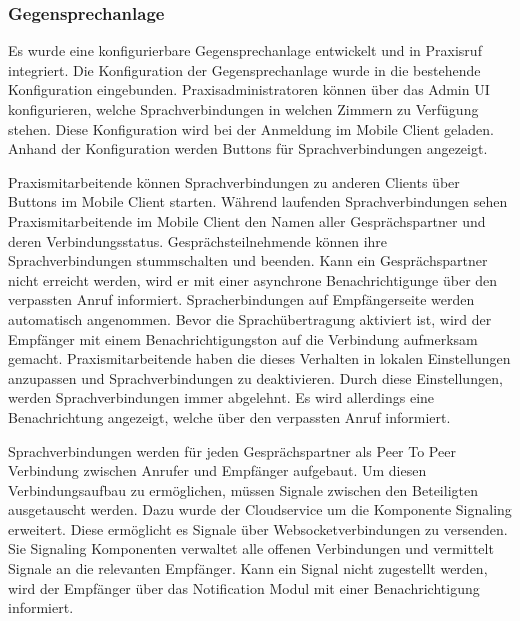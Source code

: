 \subsubsection{Gegensprechanlage}

Es wurde eine konfigurierbare Gegensprechanlage entwickelt und in Praxisruf integriert.
Die Konfiguration der Gegensprechanlage wurde in die bestehende Konfiguration eingebunden.
Praxisadministratoren können über das Admin UI konfigurieren, welche Sprachverbindungen in welchen Zimmern zu Verfügung stehen.
Diese Konfiguration wird bei der Anmeldung im Mobile Client geladen.
Anhand der Konfiguration werden Buttons für Sprachverbindungen angezeigt.

Praxismitarbeitende können Sprachverbindungen zu anderen Clients über Buttons im Mobile Client starten.
Während laufenden Sprachverbindungen sehen Praxismitarbeitende im Mobile Client den Namen aller Gesprächspartner und deren Verbindungsstatus.
Gesprächsteilnehmende können ihre Sprachverbindungen stummschalten und beenden.
Kann ein Gesprächspartner nicht erreicht werden, wird er mit einer asynchrone Benachrichtigunge über den verpassten Anruf informiert.
Spracherbindungen auf Empfängerseite werden automatisch angenommen.
Bevor die Sprachübertragung aktiviert ist, wird der Empfänger mit einem Benachrichtigungston auf die Verbindung aufmerksam gemacht.
Praxismitarbeitende haben die dieses Verhalten in lokalen Einstellungen anzupassen und Sprachverbindungen zu deaktivieren.
Durch diese Einstellungen, werden Sprachverbindungen immer abgelehnt.
Es wird allerdings eine Benachrichtung angezeigt, welche über den verpassten Anruf informiert.

Sprachverbindungen werden für jeden Gesprächspartner als Peer To Peer Verbindung zwischen Anrufer und Empfänger aufgebaut.
Um diesen Verbindungsaufbau zu ermöglichen, müssen Signale zwischen den Beteiligten ausgetauscht werden.
Dazu wurde der Cloudservice um die Komponente Signaling erweitert.
Diese ermöglicht es Signale über Websocketverbindungen zu versenden.
Sie Signaling Komponenten verwaltet alle offenen Verbindungen und vermittelt Signale an die relevanten Empfänger.
Kann ein Signal nicht zugestellt werden, wird der Empfänger über das Notification Modul mit einer Benachrichtigung informiert.

